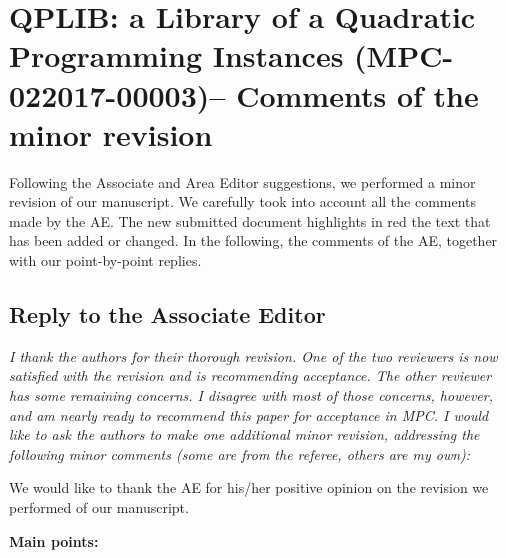 \documentclass[11pt]{article}
\newcommand{\rep}[1]{{\textcolor{acblue}{#1}}}
\newcommand{\leo}[1]{{\color{red}#1}}
\begin{document}
\section*{QPLIB: a Library of a Quadratic Programming Instances (MPC-022017-00003)-- Comments of the minor revision}

\rep{
 Following the Associate and Area Editor suggestions, we 
 performed a minor revision of our manuscript. We carefully took into account all the comments made by the AE.
 The new submitted document highlights in red the text that has been
added or changed.
In the following, the comments of the AE, together with our point-by-point replies.
}


\subsection*{Reply to the Associate Editor}

{\it
I thank the authors for their thorough revision. One of the two reviewers is now satisfied with the revision and is recommending acceptance. The other reviewer has some remaining concerns. I disagree with most of those concerns, however, and am nearly ready to recommend this paper for acceptance in MPC. I would like to ask the authors to make one additional minor revision, addressing the following minor comments (some are from the referee, others are my own):  
}

\rep{We would like to thank the AE for his/her positive opinion on the revision we performed of our manuscript. 
}

\bigskip
\textbf{Main points:}
\end{document}
